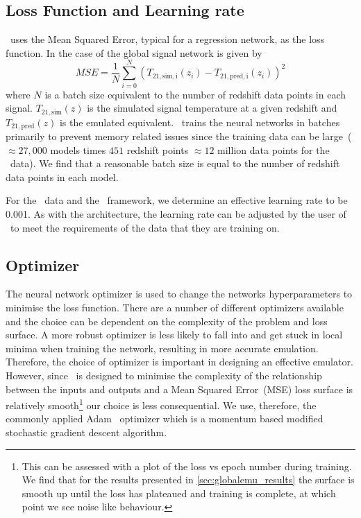 \subsection{Loss Function and Learning rate}

\name~uses the Mean Squared Error, typical for a regression network, as the loss function. In the case of the global signal network is given by
\begin{equation}
    MSE = \frac{1}{N} \sum_{i=0}^N (T_\mathrm{21, sim, i}(z_i) - T_\mathrm{21, pred, i}(z_i))^2
\end{equation}
where $N$ is a batch size equivalent to the number of redshift data points in each signal. $T_\mathrm{21, sim}(z)$ is the simulated signal temperature at a given redshift and $T_\mathrm{21, pred}(z)$ is the emulated equivalent. \name~trains the neural networks in batches primarily to prevent memory related issues since the training data can be large~($\approx 27,000$ models times $451$ redshift points $\approx 12$ million data points for the \cmGEM~data). We find that a reasonable batch size is equal to the number of redshift data points in each model.

For the \cmGEM~data and the \name~framework, we determine an effective learning rate to be 0.001. As with the architecture, the learning rate can be adjusted by the user of \name~to meet the requirements of the data that they are training on.

\subsection{Optimizer}

The neural network optimizer is used to change the networks hyperparameters to minimise the loss function. There are a number of different optimizers available~\citep{Ruder2016} and the choice can be dependent on the complexity of the problem and loss surface. A more robust optimizer is less likely to fall into and get stuck in local minima when training the network, resulting in more accurate emulation. Therefore, the choice of optimizer is important in designing an effective emulator. However, since \name~is designed to minimise the complexity of the relationship between the inputs and outputs and a Mean Squared Error~(MSE) loss surface is relatively smooth\footnote{This can be assessed with a plot of the loss vs epoch number during training. We find that for the results presented in \cref{sec:globalemu_results} the surface is smooth up until the loss has plateaued and training is complete, at which point we see noise like behaviour.} our choice is less consequential. We use, therefore, the commonly applied Adam~\citep{Kingma2014} optimizer which is a momentum based modified stochastic gradient descent algorithm. 

